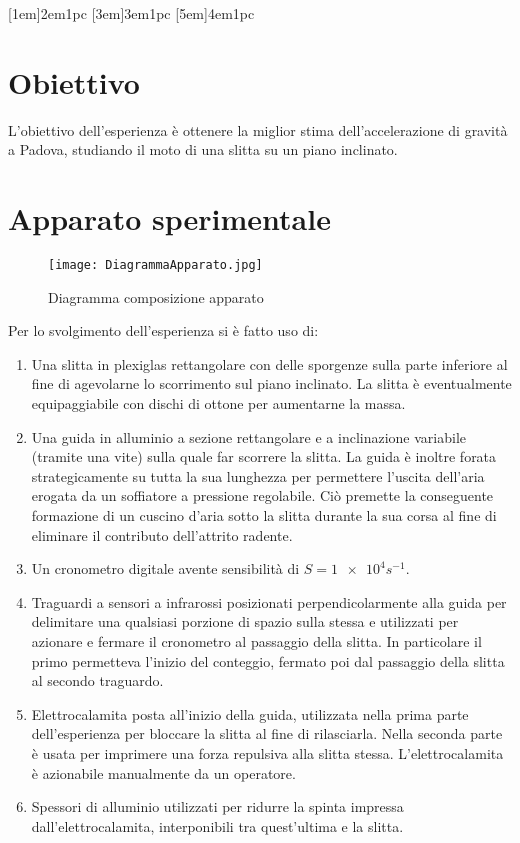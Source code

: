 \documentclass[a4paper,11pt,oneside]{article}
\begin{document}


\tableofcontents
{}
\contentsmargin{6em}
[1em]{\bigskip}{2em}{1pc}
[3em]{\smallskip}{3em}{1pc}
[5em]{\smallskip}{4em}{1pc}


\newpage

\section{Obiettivo}
L'obiettivo dell'esperienza è ottenere la miglior stima dell'accelerazione di gravità a Padova, studiando il moto di una slitta su un piano inclinato.

\section{Apparato sperimentale}\label{section:apparato}

\begin{figure}[h!]
    \centering
    \texttt{[image: DiagrammaApparato.jpg]}
    \caption{Diagramma composizione apparato}
    \label{fig:apparato_sperimentale}
\end{figure}

Per lo svolgimento dell'esperienza si è fatto uso di:
\begin{enumerate}
    \item Una slitta in plexiglas rettangolare con delle sporgenze sulla parte inferiore al fine di agevolarne lo scorrimento sul piano inclinato. La slitta è eventualmente equipaggiabile con dischi di ottone per aumentarne la massa.
    \item Una guida in alluminio a sezione rettangolare e a inclinazione variabile (tramite una vite) sulla quale far scorrere la slitta. La guida è inoltre forata strategicamente su tutta la sua lunghezza per permettere l'uscita dell'aria erogata da un soffiatore a pressione regolabile. Ciò premette la conseguente formazione di un cuscino d'aria sotto la slitta durante la sua corsa al fine di eliminare il contributo dell'attrito radente.
    \item Un cronometro digitale avente sensibilità di $S=\num{1e4} \si{s^{-1}}$.
    \item Traguardi a sensori a infrarossi posizionati perpendicolarmente alla guida per delimitare una qualsiasi porzione di spazio sulla stessa e utilizzati per azionare e fermare il cronometro al passaggio della slitta. In particolare il primo permetteva l'inizio del conteggio, fermato poi dal passaggio della slitta al secondo traguardo.
    \item Elettrocalamita posta all'inizio della guida, utilizzata nella prima parte dell'esperienza per bloccare la slitta al fine di rilasciarla. Nella seconda parte è usata per imprimere una forza repulsiva alla slitta stessa. L'elettrocalamita è azionabile manualmente da un operatore.
    \item Spessori di alluminio utilizzati per ridurre la spinta impressa dall'elettrocalamita, interponibili tra quest'ultima e la slitta.
\end{enumerate}
\end{document}
